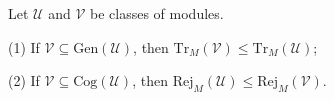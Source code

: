 Let $\mathcal{U}$ and $\mathcal{V}$ be classes of modules.

(1) If $\mathcal{V} \subseteq \mathrm{Gen}(\mathcal{U})$, then $\mathrm{Tr}_M(\mathcal{V}) \leq \mathrm{Tr}_M(\mathcal{U})$;

(2) If $\mathcal{V} \subseteq \mathrm{Cog}(\mathcal{U})$, then $\mathrm{Rej}_M(\mathcal{U}) \leq \mathrm{Rej}_M(\mathcal{V})$.
